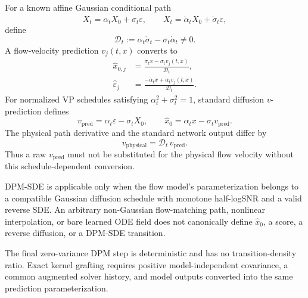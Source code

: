 \documentclass[11pt,a4paper]{article}
\theoremstyle{plain}
\theoremstyle{definition}
\begin{document}
For a known affine Gaussian conditional path
\begin{equation}
X_t=\alpha_tX_0+\sigma_t\varepsilon,
\qquad
\dot X_t=\dot\alpha_tX_0+\dot\sigma_t\varepsilon,
\label{eq:affine-path}
\end{equation}
define
\begin{equation}
\mathcal D_t
:=
\alpha_t\dot\sigma_t-\sigma_t\dot\alpha_t
\neq0.
\label{eq:path-determinant}
\end{equation}
A flow-velocity prediction $v_j(t,x)$ converts to
\begin{align}
\widehat x_{0,j}
&=
\frac{\dot\sigma_t x-\sigma_tv_j(t,x)}{\mathcal D_t},
\label{eq:velocity-to-x0}\\
\widehat\varepsilon_j
&=
\frac{-\dot\alpha_t x+\alpha_tv_j(t,x)}{\mathcal D_t}.
\label{eq:velocity-to-epsilon}
\end{align}
For normalized VP schedules satisfying
$\alpha_t^2+\sigma_t^2=1$, standard diffusion $v$-prediction defines
\begin{equation}
v_{\mathrm{pred}}
=
\alpha_t\varepsilon-\sigma_tX_0,
\qquad
\widehat x_0
=
\alpha_tx-\sigma_tv_{\mathrm{pred}}.
\label{eq:standard-v-pred}
\end{equation}
The physical path derivative and the standard network output differ by
\begin{equation}
v_{\mathrm{physical}}
=
\mathcal D_t\,v_{\mathrm{pred}}.
\label{eq:physical-v-scale}
\end{equation}
Thus a raw $v_{\mathrm{pred}}$ must not be substituted for the physical flow velocity without this
schedule-dependent conversion.

DPM-SDE is applicable only when the flow model's parameterization belongs to a compatible
Gaussian diffusion schedule with monotone half-logSNR and a valid reverse SDE.  An arbitrary
non-Gaussian flow-matching path, nonlinear interpolation, or bare learned ODE field does not
canonically define $\widehat x_0$, a score, a reverse diffusion, or a DPM-SDE transition.

\begin{tcolorbox}[colback=red!4,colframe=red!45!black,title=DPM-SDE exactness boundary]
The final zero-variance DPM step is deterministic and has no transition-density ratio.  Exact
kernel grafting requires positive model-independent covariance, a common augmented solver history,
and model outputs converted into the same prediction parameterization.
\end{tcolorbox}

\end{document}
